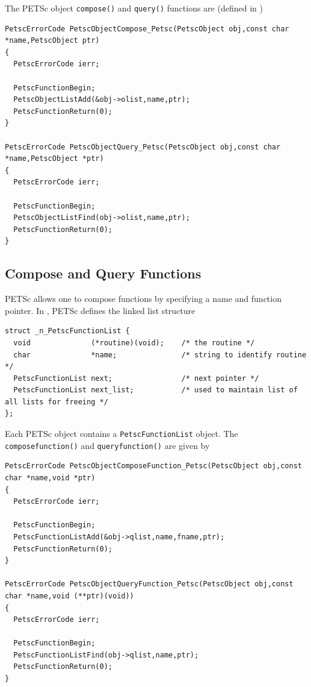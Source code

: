 The PETSc object \lstinline{compose()} and \lstinline{query()} functions are
(defined in \href{http://www.mcs.anl.gov/petsc/petsc-master/src/objects/inherit.c.html}{})
\begin{lstlisting}
PetscErrorCode PetscObjectCompose_Petsc(PetscObject obj,const char *name,PetscObject ptr)
{
  PetscErrorCode ierr;

  PetscFunctionBegin;
  PetscObjectListAdd(&obj->olist,name,ptr);
  PetscFunctionReturn(0);
}

PetscErrorCode PetscObjectQuery_Petsc(PetscObject obj,const char *name,PetscObject *ptr)
{
  PetscErrorCode ierr;

  PetscFunctionBegin;
  PetscObjectListFind(obj->olist,name,ptr);
  PetscFunctionReturn(0);
}
\end{lstlisting}

\subsection{Compose and Query Functions}

PETSc allows one to compose functions by specifying a name and function pointer.
In \href{http://www.mcs.anl.gov/petsc/petsc-master/src/sys/dll/reg.c.html}{},
PETSc defines the linked list structure

\begin{lstlisting}
struct _n_PetscFunctionList {
  void              (*routine)(void);    /* the routine */
  char              *name;               /* string to identify routine */
  PetscFunctionList next;                /* next pointer */
  PetscFunctionList next_list;           /* used to maintain list of all lists for freeing */
};
\end{lstlisting}

Each PETSc object contains a \lstinline{PetscFunctionList} object.
The \lstinline{composefunction()} and \lstinline{queryfunction()} are given by

\begin{lstlisting}
PetscErrorCode PetscObjectComposeFunction_Petsc(PetscObject obj,const char *name,void *ptr)
{
  PetscErrorCode ierr;

  PetscFunctionBegin;
  PetscFunctionListAdd(&obj->qlist,name,fname,ptr);
  PetscFunctionReturn(0);
}

PetscErrorCode PetscObjectQueryFunction_Petsc(PetscObject obj,const char *name,void (**ptr)(void))
{
  PetscErrorCode ierr;

  PetscFunctionBegin;
  PetscFunctionListFind(obj->qlist,name,ptr);
  PetscFunctionReturn(0);
}
\end{lstlisting}

